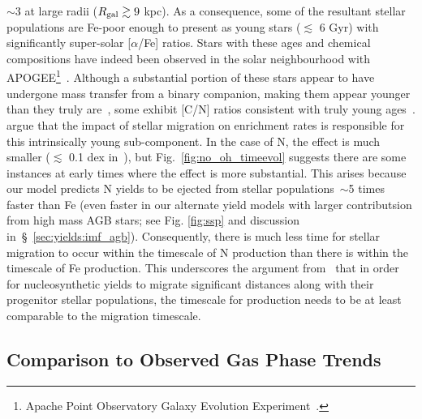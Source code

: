 \documentclass[ms.tex]{subfiles}
\begin{document}
$\sim$3 at large radii ($R_\text{gal} \gtrsim 9$ kpc).
As a consequence, some of the resultant stellar populations are Fe-poor enough
to present as young stars ($\lesssim$ 6 Gyr) with significantly super-solar
[$\alpha$/Fe] ratios.
Stars with these ages and chemical compositions have indeed been observed in
the solar neighbourhood with APOGEE\footnote{
	Apache Point Observatory Galaxy Evolution Experiment~\citep{Majewski2017}.
}~\citep{Chiappini2015, Martig2015, Martig2016, Warfield2021}.
Although a substantial portion of these stars appear to have undergone mass
transfer from a binary companion, making them appear younger than they truly
are~\citep{Jofre2016, Yong2016, Izzard2018, SilvaAguirre2018, Miglio2021}, some
exhibit [C/N] ratios consistent with truly young ages~\citep{Hekker2019}.
\citet{Johnson2021} argue that the impact of stellar migration on enrichment
rates is responsible for this intrinsically young sub-component.
In the case of N, the effect is much smaller ($\lesssim$ 0.1 dex in~\no),
but Fig.~\ref{fig:no_oh_timeevol} suggests there are some instances at early
times where the effect is more substantial.
This arises because our model predicts N yields to be ejected from stellar
populations~$\sim$5 times faster than Fe (even faster in our alternate yield
models with larger contributsion from high mass AGB stars; see Fig.
\ref{fig:ssp} and discussion in~\S~\ref{sec:yields:imf_agb}).
Consequently, there is much less time for stellar migration to occur within the
timescale of N production than there is within the timescale of Fe production.
This underscores the argument from~\citet{Johnson2021} that in order for
nucleosynthetic yields to migrate significant distances along with their
progenitor stellar populations, the timescale for production needs to be at
least comparable to the migration timescale.

\subsection{Comparison to Observed Gas Phase Trends}
\label{sec:results:yields}
\end{document}
